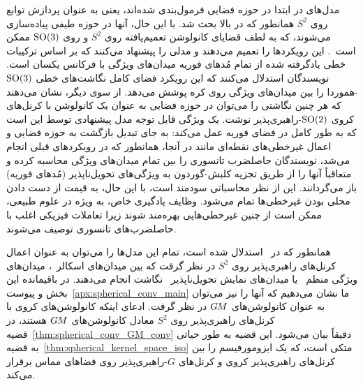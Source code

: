 مدل‌های \cite{Cohen2018-S2CNN,esteves2018zonalSpherical,esteves2020spinweighted} در ابتدا در حوزه فضایی فرمول‌بندی شده‌اند، یعنی به عنوان پردازش توابع روی $S^2$ همانطور که در بالا بحث شد.
با این حال، آنها در حوزه طیفی پیاده‌سازی می‌شوند، که به لطف قضایای کانولوشن تعمیم‌یافته روی $S^2$ و روی $\operatorname{SO}(3)$ ممکن است~\cite{makadia2006rotation,Kondor2018-GENERAL,vilenkin2013representation}.
\citet{kondor2018ClebschGordan} این رویکردها را تعمیم می‌دهند و مدلی را پیشنهاد می‌کنند که بر اساس ترکیبات خطی یادگرفته شده از تمام مُدهای فوریه میدان‌های ویژگی با فرکانس یکسان است.
نویسندگان استدلال می‌کنند که این رویکرد فضای کامل نگاشت‌های خطی $\operatorname{SO}(3)$-هموردا را بین میدان‌های ویژگی روی کره پوشش می‌دهد.
از سوی دیگر، \citet{Cohen2019-generaltheory} نشان می‌دهند که هر چنین نگاشتی را می‌توان در حوزه فضایی به عنوان یک کانولوشن با کرنل‌های کروی $\operatorname{SO}(2)$-راهبری‌پذیر نوشت.
یک ویژگی قابل توجه مدل پیشنهادی توسط \citet{kondor2018ClebschGordan} این است که به طور کامل در فضای فوریه عمل می‌کند:
به جای تبدیل بازگشت به حوزه فضایی و اعمال غیرخطی‌های نقطه‌ای مانند  در آنجا، همانطور که در رویکردهای قبلی انجام می‌شد، نویسندگان حاصلضرب تانسوری را بین تمام میدان‌های ویژگی محاسبه کرده و متعاقباً آنها را از طریق تجزیه کلبش-گوردون به ویژگی‌های تحویل‌ناپذیر (مُدهای فوریه) باز می‌گردانند.
این از نظر محاسباتی سودمند است، با این حال، به قیمت از دست دادن محلی بودن غیرخطی‌ها تمام می‌شود.
وظایف یادگیری خاص، به ویژه در علوم طبیعی، ممکن است از چنین غیرخطی‌هایی بهره‌مند شوند زیرا تعاملات فیزیکی اغلب با حاصلضرب‌های تانسوری توصیف می‌شوند.


همانطور که در~\cite{Cohen2019-generaltheory,Cohen2018-intertwiners} استدلال شده است، تمام این مدل‌ها را می‌توان به عنوان اعمال کرنل‌های راهبری‌پذیر روی $S^2$ در نظر گرفت که بین میدان‌های اسکالر~\cite{esteves2018zonalSpherical}، میدان‌های ویژگی منظم~\cite{Cohen2018-S2CNN} یا میدان‌های نمایش تحویل‌ناپذیر~\cite{esteves2020spinweighted,kondor2018ClebschGordan} نگاشت انجام می‌دهند.
در باقیمانده این بخش و پیوست~\ref{apx:spherical_conv_main} ما نشان می‌دهیم که آنها را نیز می‌توان به عنوان کانولوشن‌های $G\mkern-1.4muM$ در نظر گرفت.
ادعای اینکه کانولوشن‌های کروی با کرنل‌های راهبری‌پذیر روی $S^2$ معادل کانولوشن‌های $G\mkern-1.4muM$ هستند، در قضیه~\ref{thm:spherical_conv_GM_conv} دقیقاً بیان می‌شود.
این قضیه به طور حیاتی به قضیه~\ref{thm:spherical_kernel_space_iso} متکی است، که یک ایزومورفیسم را بین کرنل‌های راهبری‌پذیر کروی و کرنل‌های $G$-راهبری‌پذیر روی فضاهای مماس برقرار می‌کند.

